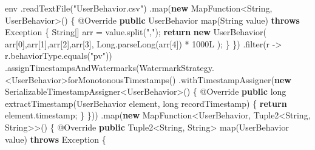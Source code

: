 \documentclass[cn,11pt,chinese]{elegantbook}
\newenvironment{Shaded}{}{}
\newcommand{\AttributeTok}[1]{\textcolor[rgb]{0.49,0.56,0.16}{#1}}
\newcommand{\BuiltInTok}[1]{#1}
\newcommand{\DataTypeTok}[1]{\textcolor[rgb]{0.56,0.13,0.00}{#1}}
\newcommand{\DecValTok}[1]{\textcolor[rgb]{0.25,0.63,0.44}{#1}}
\newcommand{\FunctionTok}[1]{\textcolor[rgb]{0.02,0.16,0.49}{#1}}
\newcommand{\KeywordTok}[1]{\textcolor[rgb]{0.00,0.44,0.13}{\textbf{#1}}}
\newcommand{\NormalTok}[1]{#1}
\newcommand{\StringTok}[1]{\textcolor[rgb]{0.25,0.44,0.63}{#1}}
\begin{document}
\begin{Shaded}
\begin{Highlighting}[]
\NormalTok{        env}
\NormalTok{            .}\FunctionTok{readTextFile}\NormalTok{(}\StringTok{"UserBehavior.csv"}\NormalTok{)}
\NormalTok{            .}\FunctionTok{map}\NormalTok{(}\KeywordTok{new}\NormalTok{ MapFunction\textless{}}\BuiltInTok{String}\NormalTok{, UserBehavior\textgreater{}() \{}
                \AttributeTok{@Override}
                \KeywordTok{public}\NormalTok{ UserBehavior }\FunctionTok{map}\NormalTok{(}\BuiltInTok{String}\NormalTok{ value) }\KeywordTok{throws} \BuiltInTok{Exception}\NormalTok{ \{}
                    \BuiltInTok{String}\NormalTok{[] arr = value.}\FunctionTok{split}\NormalTok{(}\StringTok{","}\NormalTok{);}
                    \KeywordTok{return} \KeywordTok{new} \FunctionTok{UserBehavior}\NormalTok{(}
\NormalTok{                            arr[}\DecValTok{0}\NormalTok{],arr[}\DecValTok{1}\NormalTok{],arr[}\DecValTok{2}\NormalTok{],arr[}\DecValTok{3}\NormalTok{],}
                            \BuiltInTok{Long}\NormalTok{.}\FunctionTok{parseLong}\NormalTok{(arr[}\DecValTok{4}\NormalTok{]) * }\DecValTok{1000L}
\NormalTok{                    );}
\NormalTok{                \}}
\NormalTok{            \})}
\NormalTok{            .}\FunctionTok{filter}\NormalTok{(r {-}\textgreater{} r.}\FunctionTok{behaviorType}\NormalTok{.}\FunctionTok{equals}\NormalTok{(}\StringTok{"pv"}\NormalTok{))}
\NormalTok{            .}\FunctionTok{assignTimestampsAndWatermarks}\NormalTok{(WatermarkStrategy.\textless{}UserBehavior\textgreater{}}\FunctionTok{forMonotonousTimestamps}\NormalTok{()}
\NormalTok{                    .}\FunctionTok{withTimestampAssigner}\NormalTok{(}\KeywordTok{new}\NormalTok{ SerializableTimestampAssigner\textless{}UserBehavior\textgreater{}() \{}
                        \AttributeTok{@Override}
                        \KeywordTok{public} \DataTypeTok{long} \FunctionTok{extractTimestamp}\NormalTok{(UserBehavior element, }\DataTypeTok{long}\NormalTok{ recordTimestamp) \{}
                            \KeywordTok{return}\NormalTok{ element.}\FunctionTok{timestamp}\NormalTok{;}
\NormalTok{                        \}}
\NormalTok{                    \}))}
\NormalTok{            .}\FunctionTok{map}\NormalTok{(}\KeywordTok{new}\NormalTok{ MapFunction\textless{}UserBehavior, Tuple2\textless{}}\BuiltInTok{String}\NormalTok{, }\BuiltInTok{String}\NormalTok{\textgreater{}\textgreater{}() \{}
                \AttributeTok{@Override}
                \KeywordTok{public}\NormalTok{ Tuple2\textless{}}\BuiltInTok{String}\NormalTok{, }\BuiltInTok{String}\NormalTok{\textgreater{} }\FunctionTok{map}\NormalTok{(UserBehavior value) }\KeywordTok{throws} \BuiltInTok{Exception}\NormalTok{ \{}

\end{Highlighting}
\end{Shaded}
\end{document}
